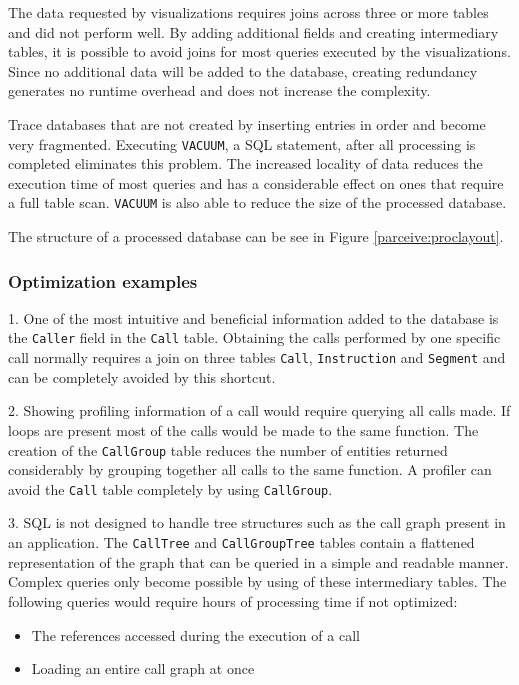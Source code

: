 The data requested by visualizations requires joins across three or more tables and did not perform well. By adding additional fields and creating intermediary tables, it is possible to avoid joins for most queries executed by the visualizations. Since no additional data will be added to the database, creating redundancy generates no runtime overhead and does not increase the complexity.

Trace databases that are not created by inserting entries in order and become very fragmented. Executing \texttt{VACUUM}, a SQL statement, after all processing is completed eliminates this problem. The increased locality of data reduces the execution time of most queries and has a considerable effect on ones that require a full table scan. \texttt{VACUUM} is also able to reduce the size of the processed database.

The structure of a processed database can be see in Figure \ref{parceive:proclayout}.

\subsubsection{Optimization examples}

1. One of the most intuitive and beneficial information added to the database is the \texttt{Caller} field in the \texttt{Call} table. Obtaining the calls performed by one specific call normally requires a join on three tables \texttt{Call}, \texttt{Instruction} and \texttt{Segment} and can be completely avoided by this shortcut.

2. Showing profiling information of a call would require querying all calls made. If loops are present most of the calls would be made to the same function. The creation of the \texttt{CallGroup} table reduces the number of entities returned considerably by grouping together all calls to the same function. A profiler can avoid the \texttt{Call} table completely by using \texttt{CallGroup}.

3. SQL is not designed to handle tree structures such as the call graph present in an application. The \texttt{CallTree} and \texttt{CallGroupTree} tables contain a flattened representation of the graph that can be queried in a simple and readable manner. Complex queries only become possible by using of these intermediary tables. The following queries would require hours of processing time if not optimized:

\begin{itemize}
	\item The references accessed during the execution of a call
	\item Loading an entire call graph at once
\end{itemize}

